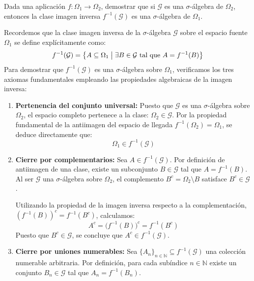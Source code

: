 \newpage
\begin{problema}
Dada una aplicación $f : \Omega_1 \to \Omega_2$, demostrar que si $\mathcal{G}$ es una $\sigma$-álgebra de $\Omega_2$, entonces la clase imagen inversa $f^{-1}(\mathcal{G})$ es una $\sigma$-álgebra de $\Omega_1$.

\tcblower

Recordemos que la clase imagen inversa de la $\sigma$-álgebra $\mathcal{G}$ sobre el espacio fuente $\Omega_1$ se define explícitamente como:
\[
    f^{-1}(\mathcal{G}) = \bigl\{ A \subseteq \Omega_1 \bigm| \exists B \in \mathcal{G} \text{ tal que } A = f^{-1}(B) \bigr\}
\]
Para demostrar que $f^{-1}(\mathcal{G})$ es una $\sigma$-álgebra sobre $\Omega_1$, verificamos los tres axiomas fundamentales empleando las propiedades algebraicas de la imagen inversa:

\begin{enumerate}
    \item \textbf{Pertenencia del conjunto universal:}
    Puesto que $\mathcal{G}$ es una $\sigma$-álgebra sobre $\Omega_2$, el espacio completo pertenece a la clase: $\Omega_2 \in \mathcal{G}$.
    Por la propiedad fundamental de la antiimagen del espacio de llegada $f^{-1}(\Omega_2) = \Omega_1$, se deduce directamente que:
    \[
        \Omega_1 \in f^{-1}(\mathcal{G})
    \]

    \item \textbf{Cierre por complementarios:}
    Sea $A \in f^{-1}(\mathcal{G})$. Por definición de antiimagen de una clase, existe un subconjunto $B \in \mathcal{G}$ tal que $A = f^{-1}(B)$.
    Al ser $\mathcal{G}$ una $\sigma$-álgebra sobre $\Omega_2$, el complemento $B^c = \Omega_2 \setminus B$ satisface $B^c \in \mathcal{G}$.
    
    Utilizando la propiedad de la imagen inversa respecto a la complementación, $(f^{-1}(B))^c = f^{-1}(B^c)$, calculamos:
    \[
        A^c = \bigl( f^{-1}(B) \bigr)^c = f^{-1}(B^c)
    \]
    Puesto que $B^c \in \mathcal{G}$, se concluye que $A^c \in f^{-1}(\mathcal{G})$.

    \item \textbf{Cierre por uniones numerables:}
    Sea $\{A_n\}_{n \in \mathbb{N}} \subseteq f^{-1}(\mathcal{G})$ una colección numerable arbitraria. Por definición, para cada subíndice $n \in \mathbb{N}$ existe un conjunto $B_n \in \mathcal{G}$ tal que $A_n = f^{-1}(B_n)$.
    

\end{enumerate}
\end{problema}
